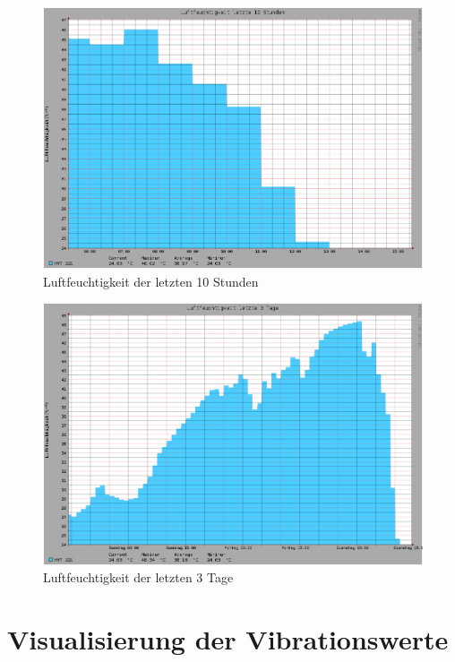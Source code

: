 \begin{figure}[!h] 
  \centering
     \includegraphics[scale=.3]{BilderAllgemein/Bilder/FeuchtigkeitTag.png}
  \caption{Luftfeuchtigkeit der letzten 10 Stunden}
\end{figure}

\begin{figure}[!h] 
  \centering
     \includegraphics[scale=.3]{BilderAllgemein/Bilder/Feuchtigkeit3Tage.png}
  \caption{Luftfeuchtigkeit der letzten 3 Tage}
\end{figure}


\section{Visualisierung der Vibrationswerte}
\label{Anhang_Visualisierung der Vibrationswerte}

